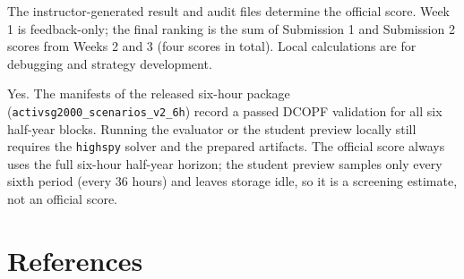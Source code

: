 \documentclass[12pt]{article}
\newcommand{\code}[1]{\texttt{#1}}
\begin{document}
\begin{description}[style=nextline,leftmargin=0pt]
  \item[Which result is official?]
  The instructor-generated result and audit files determine the official
  score. Week 1 is feedback-only; the final ranking is the sum of Submission 1
  and Submission 2 scores from Weeks 2 and 3 (four scores in total). Local calculations are for debugging and
  strategy development.

  \item[Is the scenario package validated?]
  Yes. The manifests of the released six-hour package
  (\code{activsg2000\_scenarios\_v2\_6h}) record a passed DCOPF validation for
  all six half-year blocks. Running the evaluator or the student preview
  locally still requires the \code{highspy} solver and the prepared artifacts.
  The official score always uses the full six-hour half-year horizon; the
  student preview samples only every sixth period (every 36 hours) and leaves
  storage idle, so it is a screening estimate, not an official score.
\end{description}

\section{References}


\end{document}
